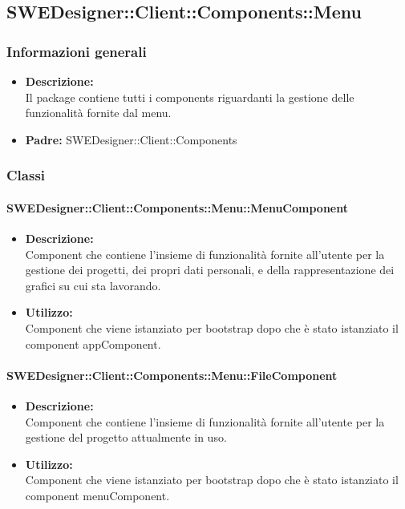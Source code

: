 	\subsection{SWEDesigner::Client::Components::Menu}
		\subsubsection{Informazioni generali}
			\begin{itemize}
          		\item \textbf{Descrizione:}\\
          		Il package contiene tutti i components riguardanti la gestione delle funzionalità fornite dal menu.
          		\item \textbf{Padre:} SWEDesigner::Client::Components
          	\end{itemize}
		\subsubsection{Classi}
			\paragraph{SWEDesigner::Client::Components::Menu::MenuComponent}
				\begin{itemize}
          			\item \textbf{Descrizione:}\\
          			Component che contiene l’insieme di funzionalità fornite all’utente per la gestione dei progetti, dei propri dati personali, e della rappresentazione dei grafici su cui sta lavorando.
          			\item \textbf{Utilizzo:}\\
          			Component che viene istanziato per bootstrap dopo che è stato istanziato il component appComponent.
          		\end{itemize}
			\paragraph{SWEDesigner::Client::Components::Menu::FileComponent}
				\begin{itemize}
          			\item \textbf{Descrizione:}\\
          			Component che contiene l’insieme di funzionalità fornite all’utente per la gestione del progetto attualmente in uso.
          			\item \textbf{Utilizzo:}\\
          			Component che viene istanziato per bootstrap dopo che è stato istanziato il component menuComponent.
          		\end{itemize}
